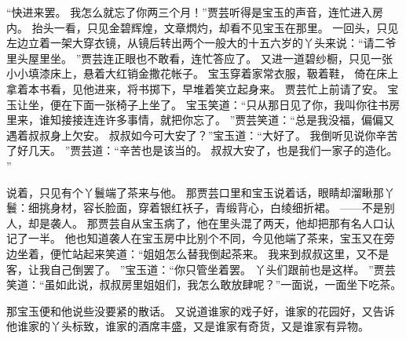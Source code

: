 “快进来罢。
我怎么就忘了你两三个月！”贾芸听得是宝玉的声音，连忙进入房内。
抬头一看，只见金碧辉煌，文章熌灼，却看不见宝玉在那里。
一回头，只见左边立着一架大穿衣镜，从镜后转出两个一般大的十五六岁的丫头来说：“请二爷里头屋里坐。
”贾芸连正眼也不敢看，连忙答应了。
又进一道碧纱橱，只见一张小小填漆床上，悬着大红销金撒花帐子。
宝玉穿着家常衣服，靸着鞋，
倚在床上拿着本书看，见他进来，将书掷下，早堆着笑立起身来。
贾芸忙上前请了安。
宝玉让坐，便在下面一张椅子上坐了。
宝玉笑道：“只从那日见了你，我叫你往书房里来，谁知接接连连许多事情，就把你忘了。
”贾芸笑道：“总是我没福，偏偏又遇着叔叔身上欠安。
叔叔如今可大安了？”宝玉道：“大好了。
我倒听见说你辛苦了好几天。
”贾芸道：“辛苦也是该当的。
叔叔大安了，也是我们一家子的造化。
”\par
说着，只见有个丫鬟端了茶来与他。
那贾芸口里和宝玉说着话，眼睛却溜瞅那丫鬟：细挑身材，容长脸面，穿着银红袄子，青缎背心，白绫细折裙。
——不是别人，却是袭人。
那贾芸自从宝玉病了，他在里头混了两天，他却把那有名人口认记了一半。
他也知道袭人在宝玉房中比别个不同，今见他端了茶来，宝玉又在旁边坐着，便忙站起来笑道：“姐姐怎么替我倒起茶来。
我来到叔叔这里，又不是客，让我自己倒罢了。
”宝玉道：“你只管坐着罢。
丫头们跟前也是这样。
”贾芸笑道：“虽如此说，叔叔房里姐姐们，我怎么敢放肆呢？”一面说，一面坐下吃茶。
\par
那宝玉便和他说些没要紧的散话。
又说道谁家的戏子好，谁家的花园好，又告诉他谁家的丫头标致，谁家的酒席丰盛，又是谁家有奇货，又是谁家有异物。
